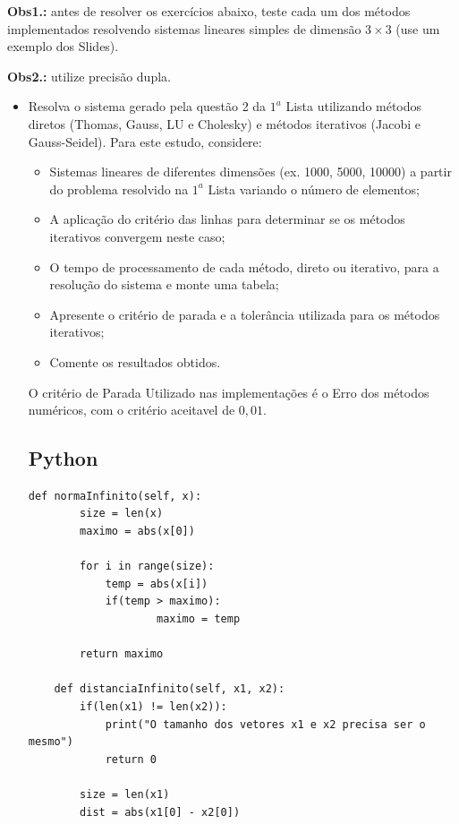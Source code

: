 \documentclass{article}
\newcounter{execs}
\newcommand{\exec}[0]{\addtocounter{execs}{1}\item[\textbf{\arabic{execs}.}]}
\begin{document}
\thispagestyle{first}

\noindent \textbf{Obs1.:} antes de resolver os exercícios abaixo, teste cada um dos métodos implementados resolvendo sistemas lineares simples de dimensão $3\times 3$ (use um exemplo dos Slides).

\noindent \textbf{Obs2.:} utilize precisão dupla.
\begin{itemize}

\exec Resolva o sistema gerado pela questão 2 da $1^a$ Lista utilizando métodos diretos (Thomas, Gauss, LU e Cholesky) e métodos iterativos (Jacobi e Gauss-Seidel). Para este estudo, considere:

\begin{itemize}
\item Sistemas lineares de diferentes dimensões (ex. 1000, 5000, 10000) a partir do problema resolvido na $1^a$ Lista variando o número de elementos; 
\item A aplicação do critério das linhas para determinar se os métodos iterativos convergem neste caso;
\item O tempo de processamento de cada método, direto ou iterativo, para a resolução do sistema e monte uma tabela;
\item Apresente o critério de parada e a tolerância utilizada para os métodos iterativos;
\item Comente os resultados obtidos.
\end{itemize}


\text O critério de Parada Utilizado nas implementações é o Erro dos métodos numéricos, com o critério aceitavel de $0,01$. 

\subsection*{Python}
\begin{lstlisting}
def normaInfinito(self, x):
        size = len(x)
        maximo = abs(x[0])   
        
        for i in range(size):
            temp = abs(x[i])        
            if(temp > maximo):
                    maximo = temp
                
        return maximo
        
    def distanciaInfinito(self, x1, x2):
        if(len(x1) != len(x2)):
            print("O tamanho dos vetores x1 e x2 precisa ser o mesmo")
            return 0
            
        size = len(x1)
        dist = abs(x1[0] - x2[0])  
        

\end{lstlisting}
\end{itemize}
\end{document}
